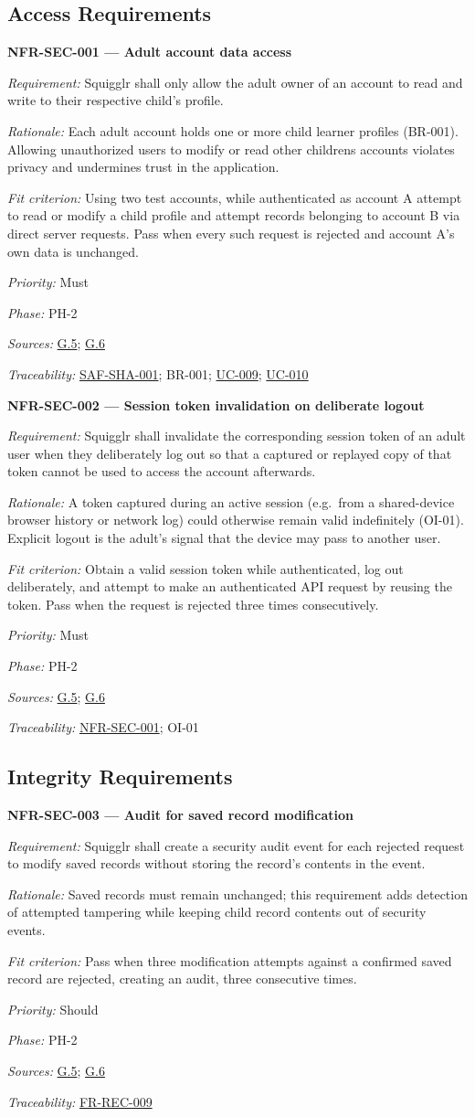 \documentclass[12pt]{article}
\renewcommand{\_}{\textunderscore\allowbreak}%
\newcommand{\goalref}[1]{\hyperref[goal:#1]{G.#1}}
\newcommand{\ucref}[1]{\hyperref[uc:#1]{\mbox{UC-#1}}}
\newenvironment{srsrequirement}[2]{%
  \par\medskip\noindent\phantomsection\label{req:#1}%
  \textbf{#1 --- #2}\par\nobreak\smallskip }{\par\medskip}
\newcommand{\reqfield}[2]{\noindent\textit{#1:} #2\par}
\newcommand{\reqshall}[1]{\reqfield{Requirement}{#1}}
\newcommand{\reqrationale}[1]{\reqfield{Rationale}{#1}}
\newcommand{\reqfit}[1]{\reqfield{Fit criterion}{#1}}
\newcommand{\reqpriority}[1]{\reqfield{Priority}{#1}}
\newcommand{\reqphase}[1]{\reqfield{Phase}{#1}}
\newcommand{\reqsources}[1]{\reqfield{Sources}{#1}}
\newcommand{\reqtraces}[1]{\reqfield{Traceability}{#1}}
\newcommand{\reqref}[1]{\hyperref[req:#1]{#1}}
\providecommand{\ucref}[1]{\hyperref[uc:#1]{UC-#1}}
\begin{document}
\subsection{Access Requirements}

\begin{srsrequirement}{NFR-SEC-001}{Adult account data access}
  \reqshall{Squigglr shall only allow the adult owner of an account to read and
write to their respective child's profile.} \reqrationale{Each adult account
holds one or more child learner profiles (BR-001). Allowing unauthorized users
to modify or read other childrens accounts violates privacy and undermines trust
in the application.} \reqfit{Using two test accounts, while authenticated as
account A attempt to read or modify a child profile and attempt records
belonging to account B via direct server requests. Pass when every such request
is rejected and account A's own data is unchanged.}
  \reqpriority{Must}
  \reqphase{PH-2}
  \reqsources{\goalref{5}; \goalref{6}} \reqtraces{\reqref{SAF-SHA-001}; BR-001;
  \ucref{009}; \ucref{010}}
\end{srsrequirement}

\begin{srsrequirement}{NFR-SEC-002}{Session token invalidation on deliberate logout}
  \reqshall{Squigglr shall invalidate the corresponding session token of an
adult user when they deliberately log out so that a captured or replayed copy of
that token cannot be used to access the account afterwards.} \reqrationale{A
token captured during an active session (e.g.\ from a shared-device browser
history or network log) could otherwise remain valid indefinitely (OI-01).
Explicit logout is the adult's signal that the device may pass to another user.}
\reqfit{Obtain a valid session token while authenticated, log out deliberately,
and attempt to make an authenticated API request by reusing the token. Pass when
the request is rejected three times consecutively.}
  \reqpriority{Must}
  \reqphase{PH-2}
  \reqsources{\goalref{5}; \goalref{6}} \reqtraces{\reqref{NFR-SEC-001}; OI-01}
\end{srsrequirement}

\subsection{Integrity Requirements}

\begin{srsrequirement}{NFR-SEC-003}{Audit for saved record modification}
  \reqshall{Squigglr shall create a security audit event for each rejected
request to modify saved records without storing the record's contents in the
event.} \reqrationale{Saved records must remain unchanged; this requirement adds
detection of attempted tampering while keeping child record contents out of
security events.} \reqfit{Pass when three modification attempts against a
confirmed saved record are rejected, creating an audit, three consecutive
times.}
  \reqpriority{Should}
  \reqphase{PH-2}
  \reqsources{\goalref{5}; \goalref{6}} \reqtraces{\reqref{FR-REC-009}}
\end{srsrequirement}
\end{document}
